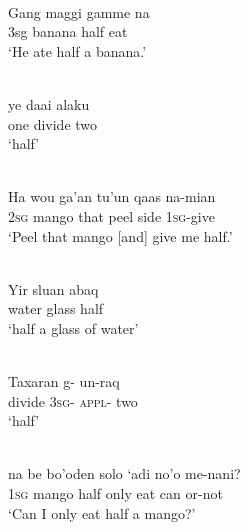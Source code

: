 \ea%
\label{bkm:Ref342746707}
\\
\gll   Gang  maggi  gamme  na  \\  
      3sg  banana  half  eat  \\
\glt  `He ate half a banana.'
\z








\ea%
\label{bkm:Ref342746708}
\\
\gll  ye  daai  alaku   \\  
    one  divide  two    \\
\glt  `half' 
\z








\ea%
\label{bkm:Ref342746924}
\\
\gll  Ha  wou  ga'an  tu'un  qaas  na-mian \\  
     \textsc{2sg } mango  that  peel  side  \textsc{1sg}{}-give \\
\glt  `Peel that mango [and] give me half.'
\z








\ea%
\label{bkm:Ref342746926}
\\
\gll   Yir  sluan  abaq   \\  
    water  glass  half      \\
\glt  `half a glass of water'
\z

               

              




\ea%
\label{bkm:Ref342746963}
\\
\gll   Taxaran  g-  un-raq   \\  
   divide  \textsc{3sg-}  \textsc{appl-} two      \\
\glt `half' 
\z

               

               
\ea
\label{ex:8:1250}
\\
\gll na  be  bo'oden  solo  `adi  no'o  me-nani? \\
  1\textsc{sg } mango  half  only  eat  can  or-not\\
\glt `Can I only eat half a mango?'
\z
 
